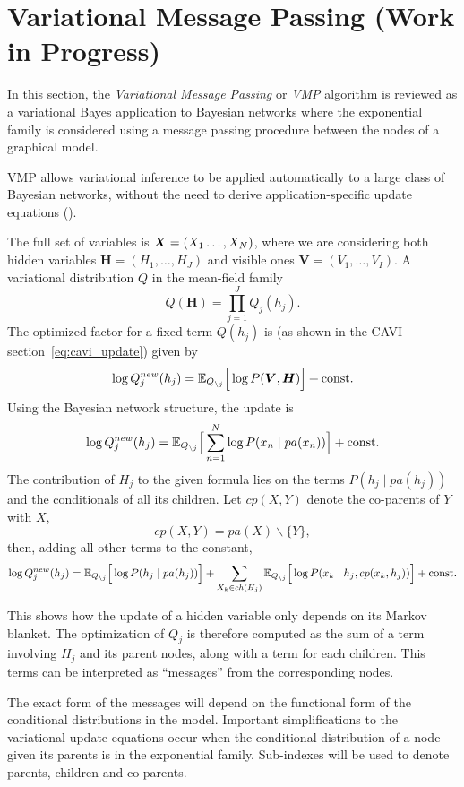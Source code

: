 \section{Variational Message Passing (Work in Progress)}\label{sec:vmp}

In this section, the \emph{Variational Message Passing} or \emph{VMP} algorithm is reviewed as a variational Bayes application to Bayesian networks where the exponential family is considered using a message passing procedure between the nodes of a graphical model.

VMP allows variational inference to be applied automatically to a large class of Bayesian networks, without the need to derive application-specific update equations (\cite{winn2005variational}).

The full set of variables is \( \bm{X} = (X_1\dots,X_N) \), where we are considering both hidden variables \( \bm{H} = (H_1,\dots,H_J) \) and visible ones \( \bm{V} = (V_{1}, \dots, V_{I})\). A variational distribution \( Q \) in the mean-field family
\[
   Q(\bm{H}) = \prod_{j=1}^J Q_{j}(h_j).
\]
The optimized factor for a fixed term \(Q(h_{j})\) is (as shown in the CAVI section~\ref{eq:cavi_update}) given by
\[
   \log Q_{j}^{new}(h_j) = \mathbb{E}_{Q_{\backslash j}}\Big[\log P(\bm{V}, \bm{H})\Big] + \text{const.}
\]
Using the Bayesian network structure, the update is
\[
  \log Q_{j}^{new}(h_j) = \mathbb{E}_{Q_{\backslash j}}\Big[ \sum_{n=1}^N \log P(x_n \mid pa(x_n))\Big] + \text{const.}
\]
The contribution of \(H_{j}\) to the given formula lies on the terms \( P(h_j \mid pa(h_j)) \) and the conditionals of all its children. Let \(cp(X,Y)\) denote the co-parents of \(Y\) with \(X\),
\[
  cp(X,Y) = pa(X)\backslash \{Y\},
\]
then, adding all other terms to the constant,
\[
   \log Q_{j}^{new}(h_j) = \mathbb{E}_{Q_{\backslash j}}\Big[\log P(h_j \mid pa(h_j))\Big] + \sum_{X_k \in ch(H_j)} \mathbb{E}_{Q_{\backslash j}}\Big[\log P(x_k \mid h_{j},cp(x_k, h_{j}))\Big] + \text{const.}
\]

This shows how the update of a hidden variable only depends on its Markov blanket. The optimization of \( Q_j \) is therefore computed as the sum of a term involving \( H_j \) and its parent nodes, along with a term for each children. This terms can be interpreted as ``messages'' from the corresponding nodes.

The exact form of the messages will depend on the functional form of the conditional distributions in the model. Important simplifications to the variational update equations occur when the conditional distribution of a node given its parents is in the exponential family. Sub-indexes will be used to denote parents, children and co-parents.

